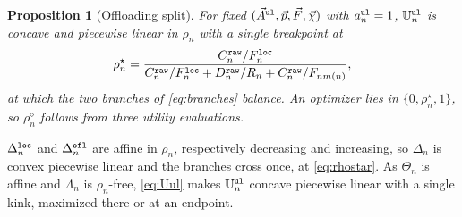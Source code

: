 \documentclass[journal]{IEEEtran}
\newtheorem{proposition}{Proposition}
\begin{document}
\begin{proposition}[Offloading split]\label{prop:rho}
For fixed $(\vec{A}^{\tt ul},\vec{p},\vec{F},\vec{\chi})$ with $a_n^{\tt ul}=1$, $\mathbb{U}_n^{\tt ul}$ is concave and piecewise linear in $\rho_n$ with a single breakpoint at
\begin{equation}
\rho_n^\star
=\frac{C_n^{\tt raw}/F_n^{\tt loc}}
{C_n^{\tt raw}/F_n^{\tt loc}+D_n^{\tt raw}/R_n+C_n^{\tt raw}/F_{n m(n)}},
\label{eq:rhostar}
\end{equation}
at which the two branches of \eqref{eq:branches} balance. An optimizer lies in $\{0,\rho_n^\star,1\}$, so $\rho_n^\diamond$ follows from three utility evaluations.
\end{proposition}
\begin{IEEEproof}
$\Delta_n^{\tt loc}$ and $\Delta_n^{\tt ofl}$ are affine in $\rho_n$, respectively decreasing and increasing, so $\Delta_n$ is convex piecewise linear and the branches cross once, at \eqref{eq:rhostar}. As $\Theta_n$ is affine and $\Lambda_n$ is $\rho_n$-free, \eqref{eq:Uul} makes $\mathbb{U}_n^{\tt ul}$ concave piecewise linear with a single kink, maximized there or at an endpoint.
\end{IEEEproof}
\end{document}

